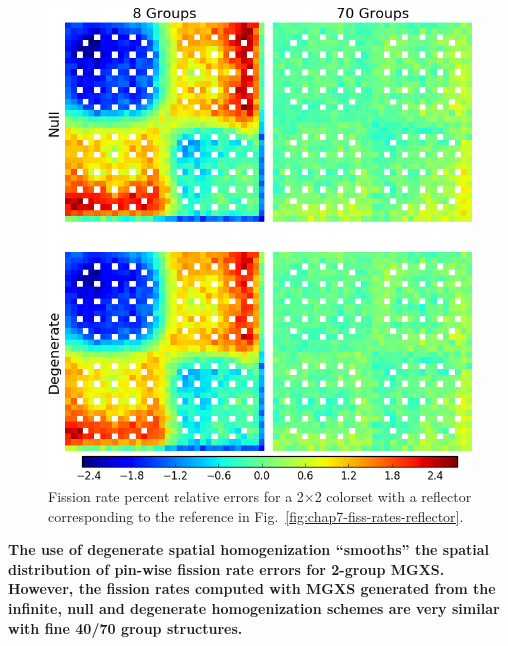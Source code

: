 \begin{figure}[h!]
\centering
\includegraphics[width=\linewidth]{figures/quantification/reflector/fiss-err}
\vspace{2mm}
\caption[Fission rate errors for a 2$\times$2 colorset with a reflector]{Fission rate percent relative errors for a 2$\times$2 colorset with a reflector corresponding to the reference in Fig.~\ref{fig:chap7-fiss-rates-reflector}.}
\label{fig:chap8-reflector-fiss-err}
\end{figure}

\clearpage



\begin{emphbox}
\textbf{The use of degenerate spatial homogenization ``smooths'' the spatial distribution of pin-wise fission rate errors for 2-group \ac{MGXS}. However, the fission rates computed with \ac{MGXS} generated from the infinite, null and degenerate homogenization schemes are very similar with fine 40/70 group structures.}
\end{emphbox}

